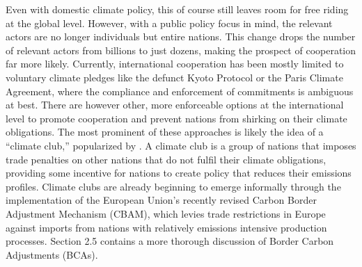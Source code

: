 Even with domestic climate policy, this of course still leaves room for free riding at the global level. However, with a public policy focus in mind, the relevant actors are no longer individuals but entire nations. This change drops the number of relevant actors from billions to just dozens, making the prospect of cooperation far more likely. Currently, international cooperation has been mostly limited to voluntary climate pledges like the defunct Kyoto Protocol or the Paris Climate Agreement, where the compliance and enforcement of commitments is ambiguous at best. There are however other, more enforceable options at the international level to promote cooperation and prevent nations from shirking on their climate obligations. The most prominent of these approaches is likely the idea of a ``climate club,'' popularized by \cite{nordhaus2015climate}. A climate club is a group of nations that imposes trade penalties on other nations that do not fulfil their climate obligations, providing some incentive for nations to create policy that reduces their emissions profiles. Climate clubs are already beginning to emerge informally through the implementation of the European Union's recently revised Carbon Border Adjustment Mechanism (CBAM), which levies trade restrictions in Europe against imports from nations with relatively emissions intensive production processes. Section 2.5 contains a more thorough discussion of Border Carbon Adjustments (BCAs).












